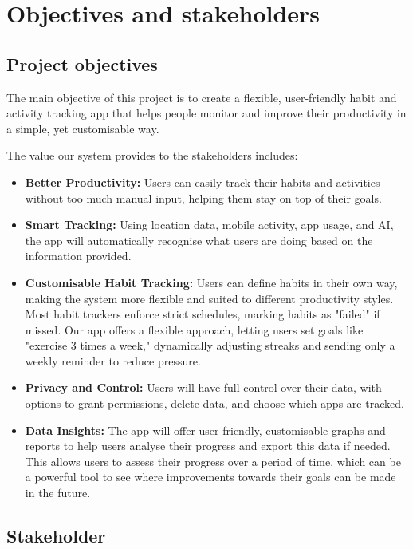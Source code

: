 \chapter{Objectives and stakeholders}

\section{Project objectives}
\label{sect:objectives}
The main objective of this project is to create a flexible, user-friendly habit and activity tracking app that helps people monitor and improve their productivity in a simple, yet customisable way. 

The value our system provides to the stakeholders includes:

\begin{itemize}
    \item \textbf{Better Productivity:} Users can easily track their habits and activities without too much manual input, helping them stay on top of their goals.
    
    \item \textbf{Smart Tracking:} Using location data, mobile activity, app usage, and AI, the app will automatically recognise what users are doing based on the information provided.

    \item \textbf{Customisable Habit Tracking:} Users can define habits in their own way, making the system more flexible and suited to different productivity styles. Most habit trackers enforce strict schedules, marking habits as "failed" if missed. Our app offers a flexible approach, letting users set goals like "exercise 3 times a week," dynamically adjusting streaks and sending only a weekly reminder to reduce pressure.

    \item \textbf{Privacy and Control:} Users will have full control over their data, with options to grant permissions, delete data, and choose which apps are tracked.

    \item \textbf{Data Insights:} The app will offer user-friendly, customisable graphs and reports to help users analyse their progress and export this data if needed. This allows users to assess their progress over a period of time, which can be a powerful tool to see where improvements towards their goals can be made in the future.
\end{itemize}

\section{Stakeholder}
\label{sect:stakeholder}


